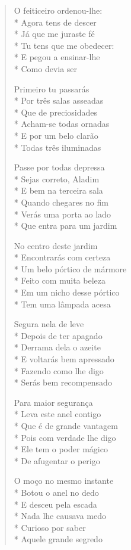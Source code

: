 \begin{verse}
O feiticeiro ordenou-lhe:\\*
Agora tens de descer\\*
Já que me juraste fé\\*
Tu tens que me obedecer:\\*
E pegou a ensinar-lhe\\*
Como devia ser

Primeiro tu passarás\\*
Por três salas asseadas\\*
Que de preciosidades\\*
Acham-se todas ornadas\\*
E por um belo clarão\\*
Todas três iluminadas

Passe por todas depressa\\*
Sejas correto, Aladim\\*
E bem na terceira sala\\*
Quando chegares no fim\\*
Verás uma porta ao lado\\*
Que entra para um jardim

No centro deste jardim\\*
Encontrarás com certeza\\*
Um belo pórtico de mármore\\*
Feito com muita beleza\\*
Em um nicho desse pórtico\\*
Tem uma lâmpada acesa

Segura nela de leve\\*
Depois de ter apagado\\*
Derrama dela o azeite\\*
E voltarás bem apressado\\*
Fazendo como lhe digo\\*
Serás bem recompensado

Para maior segurança\\*
Leva este anel contigo\\*
Que é de grande vantagem\\*
Pois com verdade lhe digo\\*
Ele tem o poder mágico\\*
De afugentar o perigo

O moço no mesmo instante\\*
Botou o anel no dedo\\*
E desceu pela escada\\*
Nada lhe causava medo\\*
Curioso por saber\\*
Aquele grande segredo


\end{verse}
